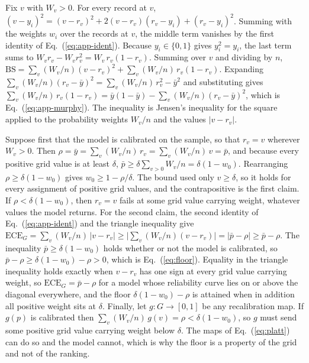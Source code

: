 \begin{pf}
Fix $v$ with $W_v > 0$. For every record at $v$,
$(v - y_i)^2 = (v - r_v)^2 + 2(v - r_v)(r_v - y_i) + (r_v - y_i)^2$. Summing with the weights
$w_i$ over the records at $v$, the middle term vanishes by the first identity of
Eq.~(\ref{eq:app-ident}). Because $y_i \in \{0, 1\}$ gives $y_i^2 = y_i$, the last term sums to
$W_v r_v - W_v r_v^2 = W_v\, r_v(1 - r_v)$. Summing over $v$ and dividing by $n$,
$\mathrm{BS} = \sum_v (W_v/n)(v - r_v)^2 + \sum_v (W_v/n)\, r_v(1 - r_v)$. Expanding
$\sum_v (W_v/n)(r_v - \bar{y})^2 = \sum_v (W_v/n)\, r_v^2 - \bar{y}^2$ and substituting gives
$\sum_v (W_v/n)\, r_v(1 - r_v) = \bar{y}(1 - \bar{y}) - \sum_v (W_v/n)(r_v - \bar{y})^2$, which
is Eq.~(\ref{eq:app-murphy}). The inequality is Jensen's inequality for the square applied to
the probability weights $W_v/n$ and the values $|v - r_v|$.
\end{pf}

\begin{proofprop}
Suppose first that the model is calibrated on the sample, so that $r_v = v$ wherever
$W_v > 0$. Then $\rho = \bar{y} = \sum_v (W_v/n)\, r_v = \sum_v (W_v/n)\, v = \bar{p}$, and
because every positive grid value is at least $\delta$,
$\bar{p} \ge \delta \sum_{v > 0} W_v/n = \delta(1 - w_0)$. Rearranging $\rho \ge \delta(1 - w_0)$
gives $w_0 \ge 1 - \rho/\delta$. The bound used only $v \ge \delta$, so it holds for every
assignment of positive grid values, and the contrapositive is the first claim. If
$\rho < \delta(1 - w_0)$, then $r_v = v$ fails at some grid value carrying weight, whatever
values the model returns. For the second claim, the second identity of Eq.~(\ref{eq:app-ident})
and the triangle inequality give
$\mathrm{ECE}_G = \sum_v (W_v/n)\,|v - r_v| \ge \bigl|\sum_v (W_v/n)(v - r_v)\bigr|
= |\bar{p} - \rho| \ge \bar{p} - \rho$. The inequality $\bar{p} \ge \delta(1 - w_0)$ holds
whether or not the model is calibrated, so $\bar{p} - \rho \ge \delta(1 - w_0) - \rho > 0$,
which is Eq.~(\ref{eq:floor}). Equality in the triangle inequality holds exactly when
$v - r_v$ has one sign at every grid value carrying weight, so $\mathrm{ECE}_G = \bar{p} - \rho$
for a model whose reliability curve lies on or above the diagonal everywhere, and the floor
$\delta(1 - w_0) - \rho$ is attained when in addition all positive weight sits at $\delta$.
Finally, let $g \colon G \to [0,1]$ be any recalibration map. If $g(p)$ is calibrated then
$\sum_v (W_v/n)\, g(v) = \rho < \delta(1 - w_0)$, so $g$ must send some positive grid value
carrying weight below $\delta$. The maps of Eq.~(\ref{eq:platt}) can do so and the model
cannot, which is why the floor is a property of the grid and not of the ranking.
\end{proofprop}

